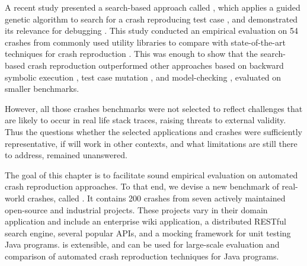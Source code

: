 



A recent study presented a search-based approach called \evocrash, which applies a guided genetic algorithm to search for a crash reproducing test case \cite{soltani2017}, and demonstrated its relevance for debugging \cite{Soltani2018a}.
This study conducted an empirical evaluation on 54 crashes from commonly used utility libraries to compare \evocrash with state-of-the-art techniques for crash reproduction \cite{soltani2017}.
This was enough to show that the search-based crash reproduction outperformed other approaches based on backward symbolic execution \cite{Chen2015}, test case mutation \cite{Xuan2015}, and model-checking \cite{Nayrolles2017}, evaluated on smaller benchmarks.

However, all those crashes benchmarks were not selected to reflect challenges that are likely to occur in real life stack traces, raising threats to external validity.
Thus the questions whether the selected applications and crashes were sufficiently representative, if \evocrash will work in other contexts, and what limitations are still there to address, remained unanswered.

The goal of this chapter is to facilitate sound empirical evaluation on automated crash reproduction approaches.
To that end, we devise a new benchmark of real-world crashes, called \crashpack.
It contains 200 crashes from seven actively maintained open-source and industrial projects.
These projects vary in their domain application and include an enterprise wiki application, a distributed RESTful search engine, several popular APIs, and a mocking framework for unit testing Java programs. 
\crashpack is extensible, and can be used for large-scale evaluation and comparison of automated crash reproduction techniques for Java programs.

